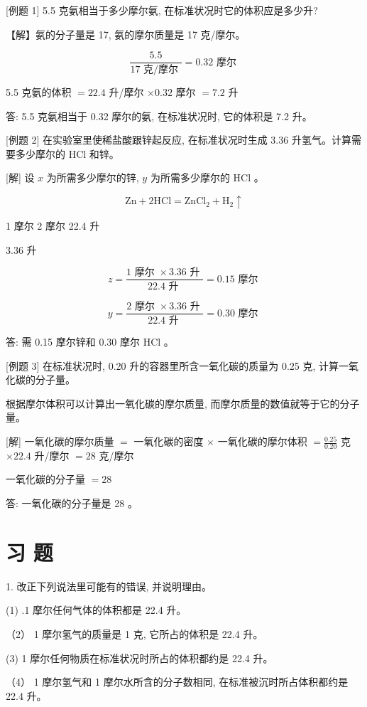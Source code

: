 \documentclass[10pt]{article}
\begin{document}
[例题 1] 5.5 克氨相当于多少摩尔氨, 在标准状况时它的体积应是多少升?

【解】氨的分子量是 17, 氨的摩尔质量是 17 克/摩尔。

\[
\frac{5.5}{{17}\text{ 克/摩尔 }} = {0.32}\text{ 摩尔 }
\]

5.5 克氨的体积 \(= {22.4}\) 升/摩尔 \(\times {0.32}\) 摩尔 \(= {7.2}\) 升

答: 5.5 克氨相当于 0.32 摩尔的氨, 在标准状况时, 它的体积是 7.2 升。

[例题 2] 在实验室里使稀盐酸跟锌起反应, 在标准状况时生成 3.36 升氢气。计算需要多少摩尔的 \(\mathrm{{HCl}}\) 和锌。

[解] 设 \(x\) 为所需多少摩尔的锌, \(y\) 为所需多少摩尔的 \(\mathrm{{HCl}}\) 。

\[
\mathrm{{Zn}} + 2\mathrm{{HCl}} = {\mathrm{{ZnCl}}}_{2} + {\mathrm{H}}_{2} \uparrow
\]

1 摩尔 2 摩尔 22.4 升

3.36 升

\[
z = \frac{1\text{ 摩尔 } \times {3.36}\text{ 升 }}{{22.4}\text{ 升 }} = {0.15}\text{ 摩尔 }
\]

\[
y = \frac{2\text{ 摩尔 } \times {3.36}\text{ 升 }}{{22.4}\text{ 升 }} = {0.30}\text{ 摩尔 }
\]

答: 需 0.15 摩尔锌和 0.30 摩尔 \(\mathrm{{HCl}}\) 。

[例题 3] 在标准状况时, 0.20 升的容器里所含一氧化碳的质量为 0.25 克, 计算一氧化碳的分子量。

根据摩尔体积可以计算出一氧化碳的摩尔质量, 而摩尔质量的数值就等于它的分子量。

[解] 一氧化碳的摩尔质量 \(=\) 一氧化碳的密度 \(\times\) 一氧化碳的摩尔体积 \(= \frac{0.25}{0.20}\) 克 \(\times {22.4}\) 升/摩尔 \(= {28}\) 克/摩尔

一氧化碳的分子量 \(= {28}\)

答: 一氧化碳的分子量是 28 。

\section*{习 题}

1. 改正下列说法里可能有的错误, 并说明理由。

(1) .1 摩尔任何气体的体积都是 22.4 升。

（2） 1 摩尔氢气的质量是 1 克, 它所占的体积是 22.4 升。

(3) 1 摩尔任何物质在标准状况时所占的体积都约是 22.4 升。

（4） 1 摩尔氢气和 1 摩尔水所含的分子数相同, 在标准被沉时所占体积都约是 22.4 升。
\end{document}
